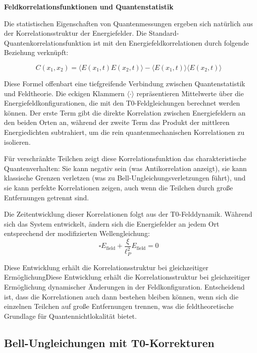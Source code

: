 \documentclass[12pt,a4paper]{article}
\newcommand{\xipar}{\xi}
\theoremstyle{definition}
\theoremstyle{remark}
\begin{document}
\textbf{Feldkorrelationsfunktionen und Quantenstatistik}

Die statistischen Eigenschaften von Quantenmessungen ergeben sich nat{\"u}rlich aus der Korrelationsstruktur der Energiefelder. Die Standard-Quantenkorrelationsfunktion ist mit den Energiefeldkorrelationen durch folgende Beziehung verkn{\"u}pft:

\begin{equation}
	C(x_1,x_2) = \langle E(x_1,t) E(x_2,t) \rangle - \langle E(x_1,t) \rangle \langle E(x_2,t) \rangle
	\label{eq:field_correlation_function}
\end{equation}

Diese Formel offenbart eine tiefgreifende Verbindung zwischen Quantenstatistik und Feldtheorie. Die eckigen Klammern $\langle \cdot \rangle$ repr{\"a}sentieren Mittelwerte {\"u}ber die Energiefeldkonfigurationen, die mit den T0-Feldgleichungen berechnet werden k{\"o}nnen. Der erste Term gibt die direkte Korrelation zwischen Energiefeldern an den beiden Orten an, w{\"a}hrend der zweite Term das Produkt der mittleren Energiedichten subtrahiert, um die rein quantenmechanischen Korrelationen zu isolieren.

F{\"u}r verschr{\"a}nkte Teilchen zeigt diese Korrelationsfunktion das charakteristische Quantenverhalten: Sie kann negativ sein (was Antikorrelation anzeigt), sie kann klassische Grenzen verletzen (was zu Bell-Ungleichungsverletzungen f{\"u}hrt), und sie kann perfekte Korrelationen zeigen, auch wenn die Teilchen durch gro{\ss}e Entfernungen getrennt sind.

Die Zeitentwicklung dieser Korrelationen folgt aus der T0-Felddynamik. W{\"a}hrend sich das System entwickelt, {\"a}ndern sich die Energiefelder an jedem Ort entsprechend der modifizierten Wellengleichung:
$$\square E_{\text{field}} + \frac{\xipar}{\ell_P^2} E_{\text{field}} = 0$$

Diese Entwicklung erh{\"a}lt die Korrelationsstruktur bei gleichzeitiger Erm{\"o}glichungDiese Entwicklung erh{\"a}lt die Korrelationsstruktur bei gleichzeitiger Erm{\"o}glichung dynamischer {\"A}nderungen in der Feldkonfiguration. Entscheidend ist, dass die Korrelationen auch dann bestehen bleiben k{\"o}nnen, wenn sich die einzelnen Teilchen auf gro{\ss}e Entfernungen trennen, was die feldtheoretische Grundlage f{\"u}r Quantennichtlokalit{\"a}t bietet.

\subsection{Bell-Ungleichungen mit T0-Korrekturen}
\end{document}
